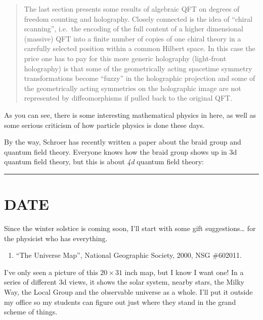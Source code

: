 \documentclass{article}
\def\tightlist{}
\renewcommand{\texttt}[1]{%
  \begingroup
  \ttfamily
  \begingroup\lccode`~=`/\lowercase{\endgroup\def~}{/\discretionary{}{}{}}%
  \begingroup\lccode`~=`[\lowercase{\endgroup\def~}{[\discretionary{}{}{}}%
  \begingroup\lccode`~=`.\lowercase{\endgroup\def~}{.\discretionary{}{}{}}%
  \catcode`/=\active\catcode`[=\active\catcode`.=\active
  \scantokens{#1\noexpand}%
  \endgroup
}
\begin{document}
\begin{quote}
The last section presents some results of algebraic QFT on degrees of
freedom counting and holography. Closely connected is the idea of
``chiral scanning'', i.e.~the encoding of the full content of a higher
dimensional (massive) QFT into a finite number of copies of one chiral
theory in a carefully selected position within a common Hilbert space.
In this case the price one has to pay for this more generic holography
(light-front holography) is that some of the geometrically acting
spacetime symmetry transformations become ``fuzzy'' in the holographic
projection and some of the geometrically acting symmetries on the
holographic image are not represented by diffeomorphisms if pulled back
to the original QFT.
\end{quote}

As you can see, there is some interesting mathematical physics in here,
as well as some serious criticism of how particle physics is done these
days.

By the way, Schroer has recently written a paper about the braid group
and quantum field theory. Everyone knows how the braid group shows up in
3d quantum field theory, but this is about \emph{4d} quantum field
theory:


\begin{center}\rule{0.5\linewidth}{0.5pt}\end{center}
\hypertarget{week162}{%
\section{DATE}\label{week162}}

Since the winter solstice is coming soon, I'll start with some gift
suggestions\ldots{} for the physicist who has everything.

\begin{enumerate}
\def\labelenumi{\arabic{enumi})}
\tightlist
\item
  ``The Universe Map'', National Geographic Society, 2000, NSG \#602011.
\end{enumerate}

I've only seen a picture of this \(20\times31\) inch map, but I know I
want one! In a series of different 3d views, it shows the solar system,
nearby stars, the Milky Way, the Local Group and the observable universe
as a whole. I'll put it outside my office so my students can figure out
just where they stand in the grand scheme of things.
\end{document}

